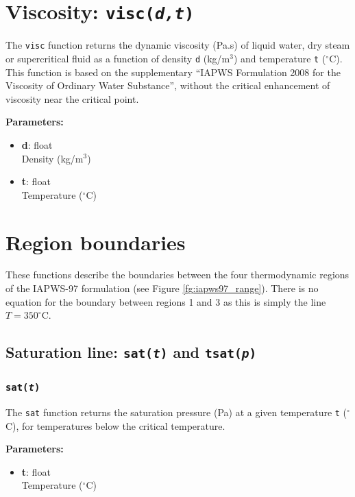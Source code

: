 \section{Viscosity: \texttt{visc(\emph{d,t})}}

The \texttt{visc} function returns the dynamic viscosity (Pa.s) of liquid water, dry steam or supercritical fluid as a function of density \texttt{d} (kg/m$^3$) and temperature \texttt{t} ($^{\circ}$C).  This function is based on the supplementary ``IAPWS Formulation 2008 for the Viscosity of Ordinary Water Substance'', without the critical enhancement of viscosity near the critical point.

\textbf{Parameters:}
\begin{itemize}
\item \textbf{d}: float\\
  Density (kg/m$^3$)
\item \textbf{t}: float\\
  Temperature ($^{\circ}$C)
\end{itemize}

\section{Region boundaries}

These functions describe the boundaries between the four thermodynamic regions of the IAPWS-97 formulation (see Figure \ref{fg:iapws97_range}).  There is no equation for the boundary between regions 1 and 3 as this is simply the line $T = 350 ^{\circ}$C.

\subsection{Saturation line: \texttt{sat(\emph{t})} and \texttt{tsat(\emph{p})}}

\subsubsection{\texttt{sat(\emph{t})}}

The \texttt{sat} function returns the saturation pressure (Pa) at a given temperature \texttt{t} ($^{\circ}$C), for temperatures below the critical temperature.

\textbf{Parameters:}
\begin{itemize}
\item \textbf{t}: float\\
  Temperature ($^{\circ}$C)
\end{itemize}

